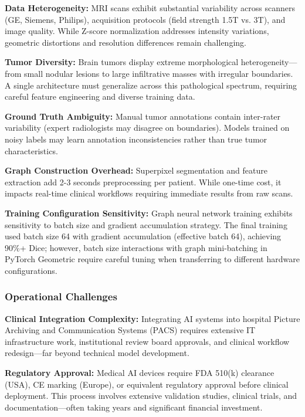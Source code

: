 \textbf{Data Heterogeneity:} MRI scans exhibit substantial variability across scanners (GE, Siemens, Philips), acquisition protocols (field strength 1.5T vs. 3T), and image quality. While Z-score normalization addresses intensity variations, geometric distortions and resolution differences remain challenging.

\textbf{Tumor Diversity:} Brain tumors display extreme morphological heterogeneity—from small nodular lesions to large infiltrative masses with irregular boundaries. A single architecture must generalize across this pathological spectrum, requiring careful feature engineering and diverse training data.

\textbf{Ground Truth Ambiguity:} Manual tumor annotations contain inter-rater variability (expert radiologists may disagree on boundaries). Models trained on noisy labels may learn annotation inconsistencies rather than true tumor characteristics.

\textbf{Graph Construction Overhead:} Superpixel segmentation and feature extraction add 2-3 seconds preprocessing per patient. While one-time cost, it impacts real-time clinical workflows requiring immediate results from raw scans.

\textbf{Training Configuration Sensitivity:} Graph neural network training exhibits sensitivity to batch size and gradient accumulation strategy. The final training used batch size 64 with gradient accumulation (effective batch 64), achieving 90\%+ Dice; however, batch size interactions with graph mini-batching in PyTorch Geometric require careful tuning when transferring to different hardware configurations.

\subsubsection{Operational Challenges}

\textbf{Clinical Integration Complexity:} Integrating AI systems into hospital Picture Archiving and Communication Systems (PACS) requires extensive IT infrastructure work, institutional review board approvals, and clinical workflow redesign—far beyond technical model development.

\textbf{Regulatory Approval:} Medical AI devices require FDA 510(k) clearance (USA), CE marking (Europe), or equivalent regulatory approval before clinical deployment. This process involves extensive validation studies, clinical trials, and documentation—often taking years and significant financial investment.

